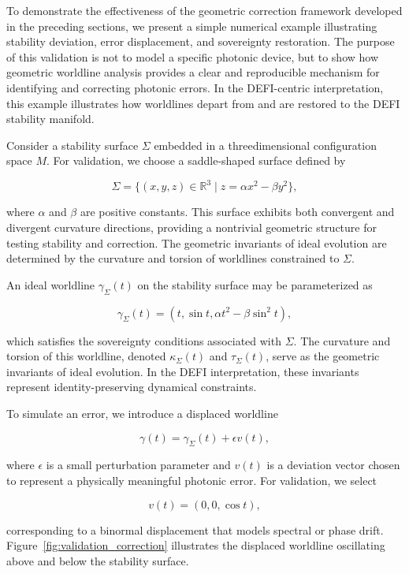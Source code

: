 \documentclass[aip,adv,reprint,floatfix]{revtex4-2}
\begin{document}
To demonstrate the effectiveness of the geometric
correction framework developed in the preceding sections, we present a simple numerical example illustrating
stability deviation, error displacement, and sovereignty
restoration.\cite{DuttonElectronField2026,DuttonSEFI2026}
The purpose of this validation is not to
model a specific photonic device, but to show how geometric worldline analysis provides a clear and reproducible mechanism for identifying and correcting photonic errors. In the DEFI-centric interpretation, this example illustrates how worldlines depart from and are restored to the DEFI stability manifold.

Consider a stability surface $\Sigma$ embedded in a threedimensional configuration space $M$. For validation, we
choose a saddle-shaped surface defined by


\[
\Sigma = \{(x, y, z) \in \mathbb{R}^{3} \mid z = \alpha x^{2} - \beta y^{2}\},
\]


where $\alpha$ and $\beta$ are positive constants.\cite{DuttonElectronField2026}
This surface exhibits both convergent and divergent curvature directions, providing a nontrivial geometric structure for testing stability and correction. The geometric invariants
of ideal evolution are determined by the curvature and
torsion of worldlines constrained to $\Sigma$.

An ideal worldline $\gamma_{\Sigma}(t)$ on the stability surface may
be parameterized as


\[
\gamma_{\Sigma}(t) = (t, \sin t, \alpha t^{2} - \beta \sin^{2} t),
\]


which satisfies the sovereignty conditions associated with
$\Sigma$.\cite{DuttonSEFI2026} The curvature and torsion of this worldline, denoted
$\kappa_{\Sigma}(t)$ and $\tau_{\Sigma}(t)$, serve as the geometric invariants of ideal
evolution. In the DEFI interpretation, these invariants
represent identity-preserving dynamical constraints.

To simulate an error, we introduce a displaced worldline


\[
\gamma(t) = \gamma_{\Sigma}(t) + \epsilon v(t),
\]


where $\epsilon$ is a small perturbation parameter and $v(t)$ is a
deviation vector chosen to represent a physically meaningful photonic error.\cite{DuttonElectronField2026}
For validation, we select


\[
v(t) = (0, 0, \cos t),
\]


corresponding to a binormal displacement that models
spectral or phase drift. Figure~\ref{fig:validation_correction} illustrates the displaced worldline oscillating above and below the stability surface.
\end{document}

